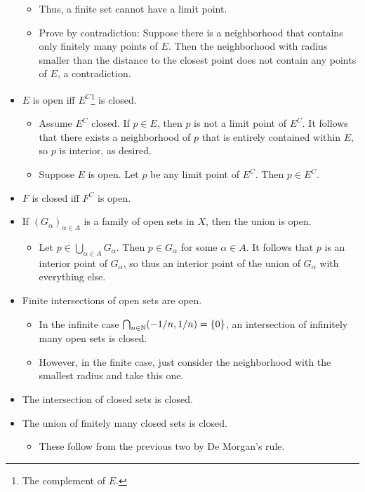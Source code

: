 \documentclass[../../notes.tex]{subfiles}
\begin{document}
\begin{itemize}
    \begin{itemize}
        \item Thus, a finite set cannot have a limit point.
        \item Prove by contradiction: Suppose there is a neighborhood that contains only finitely many points of $E$. Then the neighborhood with radius smaller than the distance to the closest point does not contain any points of $E$, a contradiction.
    \end{itemize}
    \item $E$ is open iff $E^C$\footnote{The complement of $E$.} is closed.
    \begin{itemize}
        \item Assume $E^C$ closed. If $p\in E$, then $p$ is not a limit point of $E^C$. It follows that there exists a neighborhood of $p$ that is entirely contained within $E$, so $p$ is interior, as desired.
        \item Suppose $E$ is open. Let $p$ be any limit point of $E^C$. Then $p\in E^C$.
    \end{itemize}
    \item $F$ is closed iff $F^C$ is open.
    \item If $(G_\alpha)_{\alpha\in A}$ is a family of open sets in $X$, then the union is open.
    \begin{itemize}
        \item Let $p\in\bigcup_{\alpha\in A}G_\alpha$. Then $p\in G_\alpha$ for some $\alpha\in A$. It follows that $p$ is an interior point of $G_\alpha$, so thus an interior point of the union of $G_\alpha$ with everything else.
    \end{itemize}
    \item Finite intersections of open sets are open.
    \begin{itemize}
        \item In the infinite case $\bigcap_{n\in\mathbb{N}}(-1/n,1/n)=\{0\}$, an intersection of infinitely many open sets is closed.
        \item However, in the finite case, just consider the neighborhood with the smallest radius and take this one.
    \end{itemize}
    \item The intersection of closed sets is closed.
    \item The union of finitely many closed sets is closed.
    \begin{itemize}
        \item These follow from the previous two by De Morgan's rule.

\end{itemize}
\end{itemize}
\end{document}
